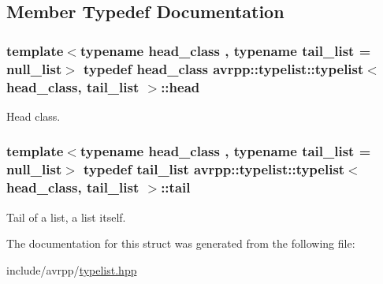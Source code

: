 \subsection{Member Typedef Documentation}
\hypertarget{structavrpp_1_1typelist_1_1typelist_a9c0f623f6451953e74189705063ad2fb}{
\subsubsection[{head}]{\setlength{\rightskip}{0pt plus 5cm}template$<$typename head\_\-class , typename tail\_\-list  = null\_\-list$>$ typedef head\_\-class {\bf avrpp::typelist::typelist}$<$ head\_\-class, tail\_\-list $>$::{\bf head}}}
\label{structavrpp_1_1typelist_1_1typelist_a9c0f623f6451953e74189705063ad2fb}


Head class. 

\hypertarget{structavrpp_1_1typelist_1_1typelist_ae9190439f5b2a89f0b63158bd70a5807}{
\subsubsection[{tail}]{\setlength{\rightskip}{0pt plus 5cm}template$<$typename head\_\-class , typename tail\_\-list  = null\_\-list$>$ typedef tail\_\-list {\bf avrpp::typelist::typelist}$<$ head\_\-class, tail\_\-list $>$::{\bf tail}}}
\label{structavrpp_1_1typelist_1_1typelist_ae9190439f5b2a89f0b63158bd70a5807}


Tail of a list, a list itself. 



The documentation for this struct was generated from the following file:\begin{DoxyCompactItemize}
\item 
include/avrpp/\hyperlink{typelist_8hpp}{typelist.hpp}\end{DoxyCompactItemize}
